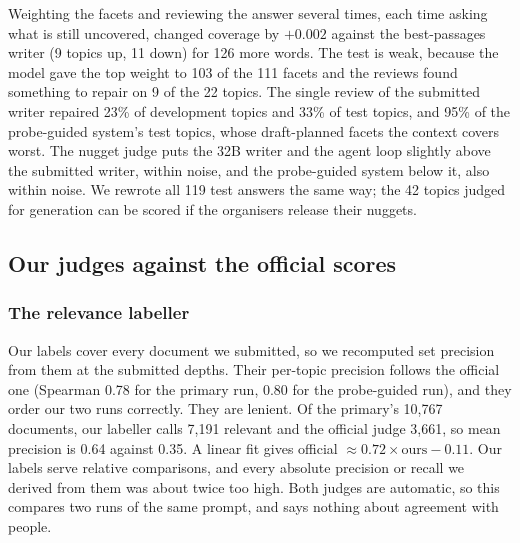 \documentclass[sigconf,nonacm]{acmart}
\begin{document}
Weighting the facets and reviewing the answer several times, each time asking what
is still uncovered, changed coverage by $+0.002$ against the best-passages writer (9
topics up, 11 down) for 126 more words. The test is weak, because the model gave the
top weight to 103 of the 111 facets and the reviews found something to repair on 9
of the 22 topics. The single review of the submitted writer repaired 23\% of
development topics and 33\% of test topics, and 95\% of the probe-guided system's
test topics, whose draft-planned facets the context covers worst. The nugget judge
puts the 32B writer and the agent loop slightly above the submitted writer, within
noise, and the probe-guided system below it, also within noise. We rewrote all 119
test answers the same way; the 42 topics judged for generation can be scored if the
organisers release their nuggets.

\subsection{Our judges against the official scores}
\label{sec:judges}

\subsubsection{The relevance labeller}
Our labels cover every document we submitted, so we recomputed set precision from
them at the submitted depths. Their per-topic precision follows the official one
(Spearman 0.78 for the primary run, 0.80 for the probe-guided run), and they order our
two runs correctly. They are lenient. Of the primary's 10,767 documents, our labeller
calls 7,191 relevant and the official judge 3,661, so mean precision is 0.64 against
0.35. A linear fit gives official $\approx 0.72 \times \text{ours} - 0.11$. Our
labels serve relative comparisons, and every absolute precision or recall we derived
from them was about twice too high. Both judges are automatic, so this compares two
runs of the same prompt, and says nothing about agreement with people.
\end{document}

